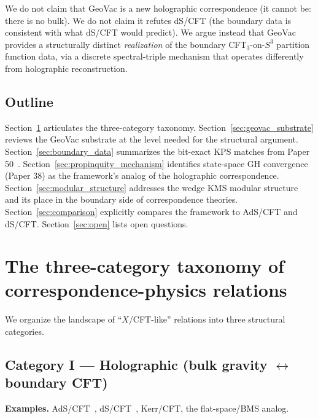 \documentclass[11pt,a4paper]{article}
\theoremstyle{plain}
\theoremstyle{definition}
\newcommand{\sthree}{S^{3}}
\begin{document}
We do not claim that GeoVac is a new holographic correspondence
(it cannot be: there is no bulk). We do not claim it refutes
dS/CFT (the boundary data is consistent with what dS/CFT would
predict). We argue instead that GeoVac provides a structurally
distinct \emph{realization} of the boundary CFT$_{3}$-on-$\sthree$
partition function data, via a discrete spectral-triple mechanism that
operates differently from holographic reconstruction.

\subsection{Outline}

Section~\ref{sec:taxonomy} articulates the three-category taxonomy.
Section~\ref{sec:geovac_substrate} reviews the GeoVac substrate at
the level needed for the structural argument.
Section~\ref{sec:boundary_data} summarizes the bit-exact KPS matches
from Paper 50~\cite{paper50}.
Section~\ref{sec:propinquity_mechanism} identifies state-space GH
convergence (Paper 38) as the framework's analog of the holographic
correspondence.
Section~\ref{sec:modular_structure} addresses the wedge KMS modular
structure and its place in the boundary side of correspondence
theories.
Section~\ref{sec:comparison} explicitly compares the framework to
AdS/CFT and dS/CFT.
Section~\ref{sec:open} lists open questions.

\section{The three-category taxonomy of correspondence-physics relations}
\label{sec:taxonomy}

We organize the landscape of ``$X$/CFT-like'' relations into three
structural categories.

\subsection{Category I --- Holographic (bulk gravity $\leftrightarrow$ boundary CFT)}

\textbf{Examples.} AdS/CFT~\cite{maldacena1997}, dS/CFT~\cite{strominger2001,
maldacena2002}, Kerr/CFT, the flat-space/BMS analog.
\end{document}
